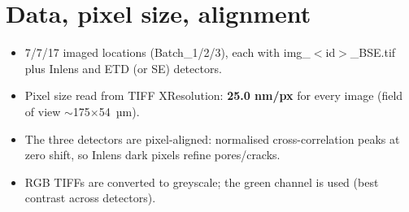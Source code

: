 \documentclass[11pt,a4paper]{article}
\begin{document}
\section{Data, pixel size, alignment}
\begin{itemize}
\item 7/7/17 imaged
locations (Batch\_1/2/3), each with img\_$<$id$>$\_BSE.tif plus Inlens and
ETD (or SE) detectors.
\item Pixel size read from TIFF XResolution: \textbf{25.0 nm/px} for every
image (field of view $\sim$175$\times$54~µm).
\item The three detectors are pixel-aligned: normalised cross-correlation
peaks at zero shift, so Inlens dark pixels refine pores/cracks.
\item RGB TIFFs are converted to greyscale; the green channel is used (best
contrast across detectors).
\end{itemize}
\scriptsize
\end{document}
